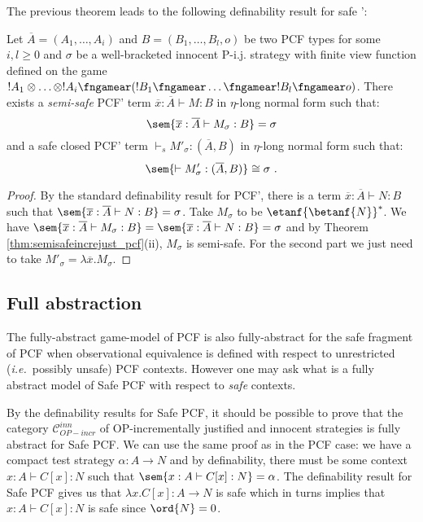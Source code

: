 The previous theorem leads to the following definability result for safe \pcf':
\begin{proposition}
\label{prop:safetydefinability}
Let $\overline{A}=(A_1,\ldots, A_i)$ and $B =(B_1, \ldots, B_l,o)$ be two PCF types for some $i,l\geq 0$ and $\sigma$ be a well-bracketed innocent
P-i.j. strategy with finite view function defined on the game $!A_1 \otimes \ldots \otimes !A_i \fngamear (!B_1 \fngamear \ldots \fngamear !B_l \fngamear o) $. There exists a \emph{semi-safe} PCF' term $\overline{x} : \overline{A} \vdash M : B$ in $\eta$-long normal form such that:
$$ \sem{\overline{x} : \overline{A} \vdash M_\sigma : B} = \sigma $$
and a safe closed PCF' term $\vdash_s M'_\sigma : (\overline{A},B)$ in $\eta$-long normal form such that:
$$ \sem{\vdash M'_\sigma : (\overline{A},B)} \cong \sigma \ .$$
\end{proposition}
\begin{proof}
By the standard definability result for PCF', there is a term $\overline{x} : \overline{A} \vdash N : B$ such that $\sem{\overline{x} :\overline{A} \vdash N : B} = \sigma$.
Take $M_\sigma$ to be $\etanf{\betanf{N}}^* $. We have $\sem{\overline{x} : \overline{A} \vdash M_\sigma : B} =  \sem{\overline{x} :\overline{A} \vdash N : B} = \sigma$ and by Theorem  \ref{thm:semisafeincrejust_pcf}(ii), $M_\sigma$ is semi-safe.
For the second part we just need to take $M'_\sigma = \lambda \overline{x}. M_\sigma$.
\end{proof}

\subsection{Full abstraction}

The fully-abstract game-model of PCF is also fully-abstract for the
safe fragment of PCF when observational equivalence is defined with
respect to unrestricted ({\it i.e.}~possibly unsafe) PCF contexts.
However one may ask what is a fully abstract model of Safe PCF with
respect to \emph{safe} contexts.


\hrulefill

By the definability results for Safe PCF, it should be possible to
prove that the category $\mathcal{C}^{inn}_{OP-incr}$ of
OP-incrementally justified and innocent strategies is fully abstract
for Safe PCF. We can use the same proof as in the PCF case: we have
a compact test strategy $\alpha:A\rightarrow N$ and by definability,
there must be some context $x:A \vdash C[x] : N$ such that $\sem{x:A
\vdash C[x] : N} = \alpha$. The definability result for Safe PCF
gives us that $\lambda x . C[x] : A \rightarrow N$ is safe which in
turns implies that $x:A \vdash C[x] : N$ is safe since $\ord{N} =
0$.

